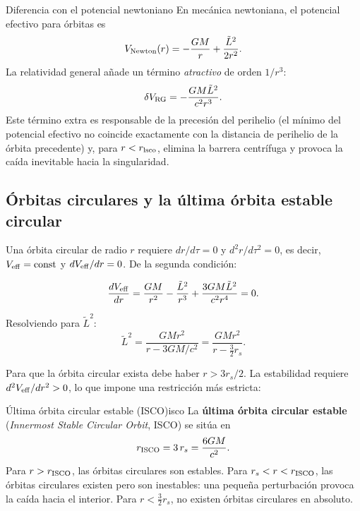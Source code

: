 \begin{observacion}{Diferencia con el potencial newtoniano}{}
En mecánica newtoniana, el potencial efectivo para órbitas es
\[
  V_{\rm Newton}(r) = -\frac{GM}{r} + \frac{\tilde{L}^2}{2r^2}.
\]
La relatividad general añade un término \emph{atractivo} de orden $1/r^3$:
\[
  \delta V_{\rm RG} = -\frac{GM\tilde{L}^2}{c^2 r^3}.
\]
Este término extra es responsable de la precesión del perihelio (el mínimo del potencial efectivo no coincide exactamente con la distancia de perihelio de la órbita precedente) y, para $r < r_{\rm lsco}$, elimina la barrera centrífuga y provoca la caída inevitable hacia la singularidad.
\end{observacion}

\subsection{Órbitas circulares y la última órbita estable circular}

Una órbita circular de radio $r$ requiere $dr/d\tau = 0$ y $d^2r/d\tau^2 = 0$, es decir, $V_{\rm eff} = \text{const}$ y $dV_{\rm eff}/dr = 0$. De la segunda condición:

\begin{equation}
  \frac{dV_{\rm eff}}{dr} = \frac{GM}{r^2} - \frac{\tilde{L}^2}{r^3} + \frac{3GM\tilde{L}^2}{c^2 r^4} = 0.
\end{equation}

Resolviendo para $\tilde{L}^2$:
\begin{equation}
  \tilde{L}^2 = \frac{GMr^2}{r - 3GM/c^2} = \frac{GMr^2}{r - \frac{3}{2}r_s}.
  \label{eq:momento_circ}
\end{equation}

Para que la órbita circular exista debe haber $r > 3r_s/2$. La estabilidad requiere $d^2V_{\rm eff}/dr^2 > 0$, lo que impone una restricción más estricta:

\begin{proposicion}{Última órbita circular estable (ISCO)}{isco}
La \textbf{última órbita circular estable} (\emph{Innermost Stable Circular Orbit}, ISCO) se sitúa en
\begin{equation}
  r_{\rm ISCO} = 3\,r_s = \frac{6GM}{c^2}.
  \label{eq:isco}
\end{equation}
Para $r > r_{\rm ISCO}$, las órbitas circulares son estables. Para $r_s < r < r_{\rm ISCO}$, las órbitas circulares existen pero son inestables: una pequeña perturbación provoca la caída hacia el interior. Para $r < \frac{3}{2}r_s$, no existen órbitas circulares en absoluto.
\end{proposicion}

